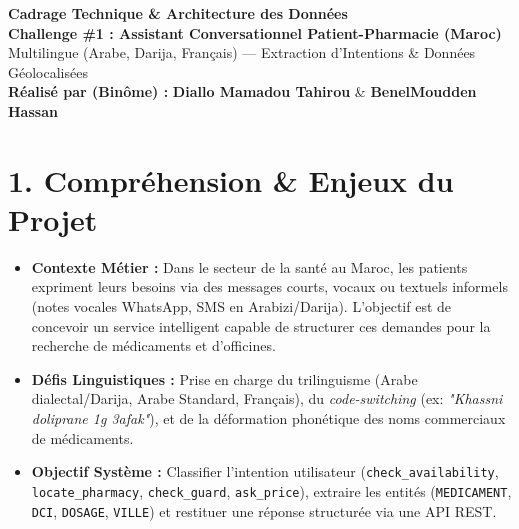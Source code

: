 \documentclass[10pt,a4paper]{article}
\begin{document}
\begin{center}
    {\color{primary}\LARGE \bfseries Cadrage Technique \& Architecture des Données}\\[4pt]
    {\color{secondary}\large \bfseries Challenge \#1 : Assistant Conversationnel Patient-Pharmacie (Maroc)}\\[3pt]
    {\small \color{darktext} Multilingue (Arabe, Darija, Français) --- Extraction d'Intentions \& Données Géolocalisées}\\[4pt]
    {\small \textbf{Réalisé par (Binôme) :} \textbf{Diallo Mamadou Tahirou} \quad \& \quad \textbf{BenelMoudden Hassan}}
\end{center}

\vspace{0.15cm}

\section*{1. Compréhension \& Enjeux du Projet}
\begin{itemize}
    \item \textbf{Contexte Métier :} Dans le secteur de la santé au Maroc, les patients expriment leurs besoins via des messages courts, vocaux ou textuels informels (notes vocales WhatsApp, SMS en Arabizi/Darija). L'objectif est de concevoir un service intelligent capable de structurer ces demandes pour la recherche de médicaments et d’officines.
    \item \textbf{Défis Linguistiques :} Prise en charge du trilinguisme (Arabe dialectal/Darija, Arabe Standard, Français), du \textit{code-switching} (ex: \textit{"Khassni doliprane 1g 3afak"}), et de la déformation phonétique des noms commerciaux de médicaments.
    \item \textbf{Objectif Système :} Classifier l'intention utilisateur (\texttt{check\_availability}, \texttt{locate\_pharmacy}, \texttt{check\_guard}, \texttt{ask\_price}), extraire les entités (\texttt{MEDICAMENT}, \texttt{DCI}, \texttt{DOSAGE}, \texttt{VILLE}) et restituer une réponse structurée via une API REST.
\end{itemize}

\vspace{0.25cm}

\end{document}
